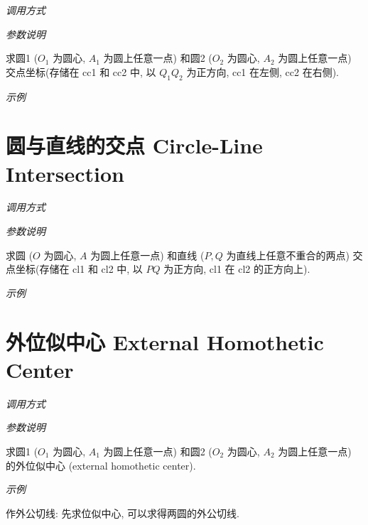 \emph{调用方式}

\begin{tcolorbox}{}
\end{tcolorbox}

\emph{参数说明}

求圆1 ($O_1$ 为圆心, $A_1$ 为圆上任意一点)
和圆2 ($O_2$ 为圆心, $A_2$ 为圆上任意一点) 
交点坐标(存储在 cc1 和 cc2 中, 以 $Q_1Q_2$ 为正方向, cc1 在左侧, cc2 在右侧).

\emph{示例}


\section{圆与直线的交点 Circle-Line Intersection}

\emph{调用方式}

\begin{tcolorbox}{}
\end{tcolorbox}

\emph{参数说明}

求圆 ($O$ 为圆心, $A$ 为圆上任意一点)
和直线 ($P,Q$ 为直线上任意不重合的两点) 
交点坐标(存储在 cl1 和 cl2 中, 以 $PQ$ 为正方向, cl1 在 cl2 的正方向上).

\emph{示例}


\section{外位似中心 External Homothetic Center}

\emph{调用方式}

\begin{tcolorbox}{}
\end{tcolorbox}

\emph{参数说明}

求圆1 ($O_1$ 为圆心, $A_1$ 为圆上任意一点)
和圆2 ($O_2$ 为圆心, $A_2$ 为圆上任意一点) 
的外位似中心 (external homothetic center)\cite{HOMO}.

\emph{示例}

作外公切线: 先求位似中心, 可以求得两圆的外公切线.


